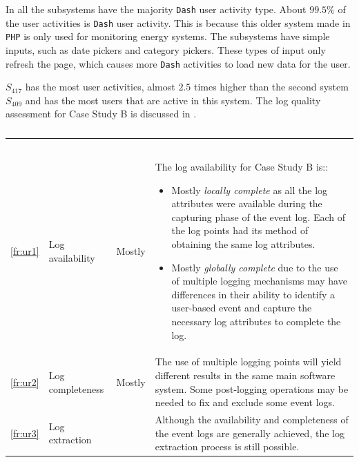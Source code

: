 In  all the subsystems have the majority \texttt{Dash} user activity type. About $99.5\%$ of the user activities is \texttt{Dash} user activity. This is because this older system made in \texttt{PHP} is only used for monitoring energy systems. The subsystems have simple inputs, such as date pickers and category pickers. These types of input only refresh the page, which causes more \texttt{Dash} activities to load new data for the user.\par $S_{417}$ has the most user activities, almost $2.5$ times higher than the second system $S_{409}$ and has the most users that are active in this system. The log quality assessment for Case Study B is discussed in .

\begin{xltabular}{\textwidth}{clcX}
	\caption[Logging quality assessment of Case Study B]{\textit{Logging quality assessment of Case Study B}}\label{tbl:ch3_caseBQuality}\\
	\toprule
	 &  &  &  \\
	\midrule
	\endfirsthead

	\caption[]{\continueCaption} \\
	\toprule
	 &  &  &  \\
	\midrule
	\endhead

	\midrule
	 \\
	\endfoot
	\endlastfoot

	\ref{fr:ur1} & Log availability & Mostly & \RaggedRight The log availability for Case Study B is::
		\begin{itemize}
			\item Mostly \textit{locally complete} as all the log attributes were available during the capturing phase of the event log. Each of the log points had its method of obtaining the same log attributes.
			\item Mostly \textit{globally complete} due to the use of multiple logging mechanisms may have differences in their ability to identify a user-based event and capture the necessary log attributes to complete the log. 
		\end{itemize} \\
	\ref{fr:ur2} & Log completeness & Mostly & The use of multiple logging points will yield different results in the same main software system. Some post-logging operations may be needed to fix and exclude some event logs. \\
	\ref{fr:ur3} & Log extraction & \cmark & Although the availability and completeness of the event logs are generally achieved, the log extraction process is still possible.   \\
	\bottomrule
\end{xltabular}

